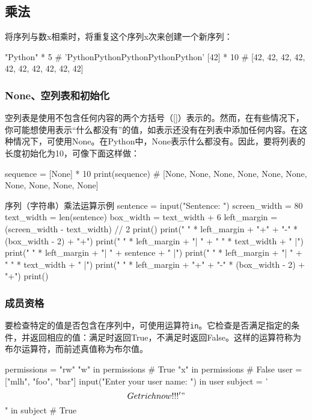 \subsection{乘法}
将序列与数x相乘时，将重复这个序列x次来创建一个新序列：
\begin{pyc}
"Python" * 5  # 'PythonPythonPythonPythonPython'
[42] * 10  # [42, 42, 42, 42, 42, 42, 42, 42, 42, 42]
\end{pyc}
\subsubsection{None、空列表和初始化}
空列表是使用不包含任何内容的两个方括号（[]）表示的。然而，在有些情况下，你可能想使用表示“什么都没有”的值，如表示还没有在列表中添加任何内容。在这种情况下，可使用None。在Python中，None表示什么都没有。因此，要将列表的长度初始化为10，可像下面这样做：
\begin{pyc}
sequence = [None] * 10
print(sequence)  # [None, None, None, None, None, None, None, None, None, None]
\end{pyc}

\begin{py}{序列（字符串）乘法运算示例}
sentence = input("Sentence: ")
screen_width = 80
text_width = len(sentence)
box_width = text_width + 6
left_margin = (screen_width - text_width) // 2
print()
print(" " * left_margin + "+" + "-" * (box_width - 2) + "+")
print(" " * left_margin + "|  " + " " * text_width + "  |")
print(" " * left_margin + "|  " + sentence + "  |")
print(" " * left_margin + "|  " + " " * text_width + "  |")
print(" " * left_margin + "+" + "-" * (box_width - 2) + "+")
print()
\end{py}

\subsubsection{成员资格}
要检查特定的值是否包含在序列中，可使用运算符\verb|in|。它检查是否满足指定的条件，并返回相应的值：满足时返回True，不满足时返回False。这样的运算符称为布尔运算符，而前述真值称为布尔值。
\begin{pyc}
permissions = "rw"
"w" in permissions  # True
"x" in permissions  # False
user = ["mlh", "foo", "bar"]
input("Enter your user name: ") in user
subject = '$$ Get rich now !!!'
"$$" in subject  # True
\end{pyc}


